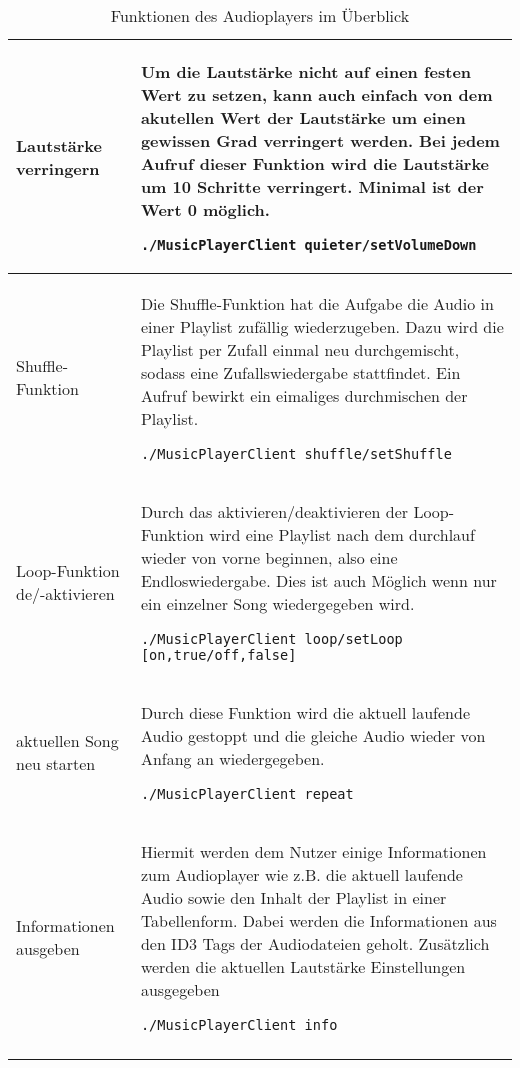 \begin{longtable}{l|l}
Lautstärke verringern & \begin{minipage}[t]{.558\textwidth} Um die Lautstärke nicht auf einen festen Wert zu setzen, kann auch einfach von dem akutellen Wert der Lautstärke um einen gewissen Grad verringert werden. Bei jedem Aufruf dieser Funktion wird die Lautstärke um 10 Schritte verringert. Minimal ist der Wert 0 möglich. \begin{lstlisting}
./MusicPlayerClient quieter/setVolumeDown
\end{lstlisting} \end{minipage} \\ \hline

Shuffle-Funktion & \begin{minipage}[t]{.558\textwidth} Die Shuffle-Funktion hat die Aufgabe die Audio in einer Playlist zufällig wiederzugeben. Dazu wird die Playlist per Zufall einmal neu durchgemischt, sodass eine Zufallswiedergabe stattfindet. Ein Aufruf bewirkt ein eimaliges durchmischen der Playlist. \begin{lstlisting}
./MusicPlayerClient shuffle/setShuffle
\end{lstlisting} \end{minipage} \\ \hline

Loop-Funktion de/-aktivieren & \begin{minipage}[t]{.558\textwidth} Durch das aktivieren/deaktivieren der Loop-Funktion wird eine Playlist nach dem durchlauf wieder von vorne beginnen, also eine Endloswiedergabe. Dies ist auch Möglich wenn nur ein einzelner Song wiedergegeben wird. \begin{lstlisting}
./MusicPlayerClient loop/setLoop [on,true/off,false]
\end{lstlisting} \end{minipage} \\ \hline

aktuellen Song neu starten & \begin{minipage}[t]{.558\textwidth} Durch diese Funktion wird die aktuell laufende Audio gestoppt und die gleiche Audio wieder von Anfang an wiedergegeben. \begin{lstlisting}
./MusicPlayerClient repeat
\end{lstlisting} \end{minipage} \\ \hline

Informationen ausgeben & \begin{minipage}[t]{.558\textwidth} Hiermit werden dem Nutzer einige Informationen zum Audioplayer wie z.B. die aktuell laufende Audio sowie den Inhalt der Playlist in einer Tabellenform. Dabei werden die Informationen aus den ID3 Tags der Audiodateien geholt. Zusätzlich werden die aktuellen Lautstärke Einstellungen ausgegeben \begin{lstlisting}
./MusicPlayerClient info
\end{lstlisting} \end{minipage} \\
\caption{Funktionen des Audioplayers im Überblick} %
\label{tab:funktionendesaudioplayer_longtable}
\end{longtable}

